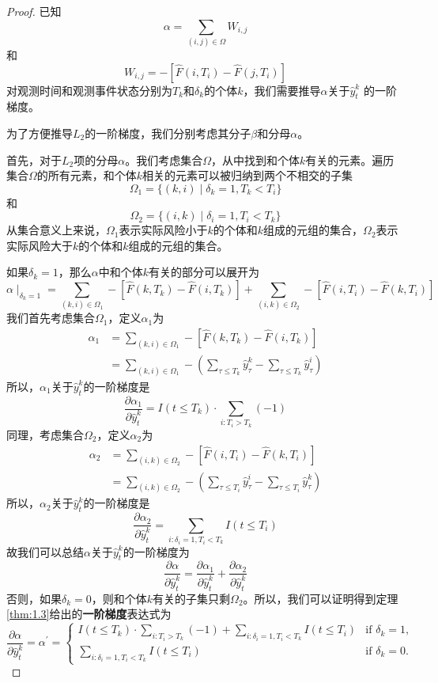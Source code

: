\begin{proof}
已知$$\alpha = \sum_{(i,j)\in \Omega} W_{i,j}$$ 和 $$W_{i,j} = -\left[ \hat{F}(i, T_i) - \hat{F}(j, T_i) \right]$$ 对观测时间和观测事件状态分别为$T_k$和$\delta_k$的个体$k$，我们需要推导$\alpha$关于$\hat{y}_t^k$ 的一阶梯度。

为了方便推导$L_2$的一阶梯度，我们分别考虑其分子$\beta$和分母$\alpha$。

首先，对于$L_2$项的分母$\alpha$。我们考虑集合$\Omega$，从中找到和个体$k$有关的元素。遍历集合$\Omega$的所有元素，和个体$k$相关的元素可以被归纳到两个不相交的子集$$\Omega_1=\{(k,i) \mid \delta_k=1,T_k < T_i\}$$ 和 $$\Omega_2=\{(i,k) \mid \delta_i=1,T_i < T_k\}$$ 从集合意义上来说，$\Omega_1$表示实际风险小于$k$的个体和$k$组成的元组的集合，$\Omega_2$表示实际风险大于$k$的个体和$k$组成的元组的集合。

如果$\delta_k = 1$，那么$\alpha$中和个体$k$有关的部分可以展开为$$\alpha \mid_{\delta_k=1}=\sum_{(k,i)\in \Omega_1} -\left[ \hat{F}(k, T_k) - \hat{F}(i, T_k) \right] + \sum_{(i,k)\in \Omega_2} -\left[ \hat{F}(i, T_i) - \hat{F}(k, T_i) \right] $$ 我们首先考虑集合$\Omega_1$，定义$\alpha_1$为\[
\begin{split}
\alpha_1 &= \sum_{(k,i)\in \Omega_1} -\left[ \hat{F}(k, T_k) - \hat{F}(i, T_k) \right] \\
         &= \sum_{(k,i)\in \Omega_1} - ( \sum_{\tau \le T_k} \hat{y}_{\tau}^k - \sum_{\tau \le T_k} \hat{y}_{\tau}^i )
\end{split}
\] 所以，$\alpha_1$关于$\hat{y}_t^k$的一阶梯度是$$\frac{\partial \alpha_1}{\partial \hat{y}_t^k} = I(t\le T_k)\cdot {\sum\limits_{i: T_i>T_k}(-1)}$$ 同理，考虑集合$\Omega_2$，定义$\alpha_2$为\[
\begin{split}
\alpha_2 &= \sum_{(i,k)\in \Omega_2} -\left[ \hat{F}(i, T_i) - \hat{F}(k, T_i) \right] \\
         &= \sum_{(i,k)\in \Omega_2} - ( \sum_{\tau \le T_i} \hat{y}_{\tau}^i - \sum_{\tau \le T_i} \hat{y}_{\tau}^k )
\end{split}
\] 所以，$\alpha_2$关于$\hat{y}_t^k$的一阶梯度是$$\frac{\partial \alpha_2}{\partial \hat{y}_t^k} = \sum\limits_{i: \delta_i=1,T_i<T_k} I(t\le T_i)$$ 故我们可以总结$\alpha$关于$\hat{y}_t^k$的一阶梯度为$$\frac{\partial \alpha}{\partial \hat{y}_t^k} = \frac{\partial \alpha_1}{\partial \hat{y}_t^k} + \frac{\partial \alpha_2}{\partial \hat{y}_t^k}$$ 否则，如果$\delta_k = 0$，则和个体$k$有关的子集只剩$\Omega_2$。所以，我们可以证明得到定理\ref{thm:1.3}给出的\textbf{一阶梯度}表达式为$$
\frac{\partial \alpha}{\partial \hat{y}_t^k}=\alpha^{'}=
\begin{cases}
I(t\le T_k)\cdot {\sum\limits_{i: T_i>T_k}(-1)} + \sum\limits_{i: \delta_i=1,T_i<T_k} I(t\le T_i) & \text{if } \delta_k = 1,\\
\sum\limits_{i: \delta_i=1,T_i<T_k} I(t\le T_i) & \text{if } \delta_k = 0.
\end{cases}
$$


\end{proof}

